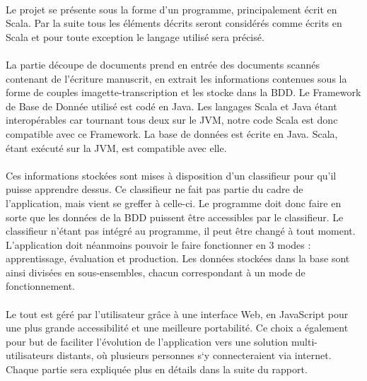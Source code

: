\paragraph{}

Le projet se présente sous la forme d’un programme, principalement écrit en Scala. Par la suite tous les éléments décrits seront considérés comme écrits en Scala et pour toute exception le langage utilisé sera précisé.

\paragraph{}

La partie découpe de documents prend en entrée des documents scannés contenant de l’écriture manuscrit, en extrait les informations contenues sous la forme de couples imagette-transcription et les stocke dans la BDD.
Le Framework de Base de Donnée utilisé est codé en Java. Les langages Scala et Java étant interopérables car tournant tous deux sur le JVM, notre code Scala est donc compatible avec ce Framework.
La base de données est écrite en Java. Scala, étant exécuté sur la JVM, est compatible avec elle.

\paragraph{}

Ces informations stockées sont mises à disposition d’un classifieur pour qu’il puisse apprendre dessus. Ce classifieur ne fait pas partie du cadre de l’application, mais vient se greffer à celle-ci. Le programme doit donc faire en sorte que les données de la BDD puissent être accessibles par le classifieur. Le classifieur n’étant pas intégré au programme, il peut être changé à tout moment. L’application doit néanmoins pouvoir le faire fonctionner en 3 modes : apprentissage, évaluation et production.
Les données stockées dans la base sont ainsi divisées en sous-ensembles, chacun correspondant à un mode de fonctionnement.

\paragraph{}

Le tout est géré par l’utilisateur grâce à une interface Web, en JavaScript pour une plus grande accessibilité et une meilleure portabilité. Ce choix a également pour but de faciliter l’évolution de l’application vers une solution multi-utilisateurs distants, où plusieurs personnes s‘y connecteraient via internet.
Chaque partie sera expliquée plus en détails dans la suite du rapport.


